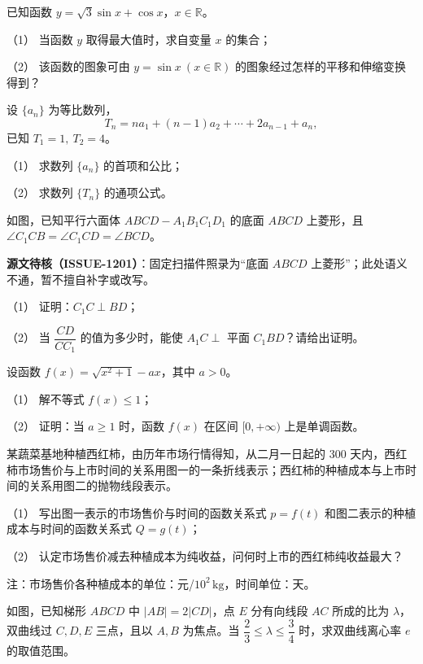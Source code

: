 \begin{question}
已知函数 $y=\sqrt{3}\sin x+\cos x$，$x\in\mathbb{R}$。

（1） 当函数 $y$ 取得最大值时，求自变量 $x$ 的集合；

（2） 该函数的图象可由 $y=\sin x\ (x\in\mathbb{R})$ 的图象经过怎样的平移和伸缩变换得到？

\end{question}
\begin{question}
设 $\{a_n\}$ 为等比数列，
\nopagebreak[4]
\[
T_n=na_1+(n-1)a_2+\cdots+2a_{n-1}+a_n,
\]
已知 $T_1=1,\ T_2=4$。

（1） 求数列 $\{a_n\}$ 的首项和公比；

（2） 求数列 $\{T_n\}$ 的通项公式。

\Needspace{0.4\textheight}
\end{question}
\begin{question}
如图，已知平行六面体 $ABCD-A_1B_1C_1D_1$ 的底面 $ABCD$ 上菱形，且 $\angle C_1CB=\angle C_1CD=\angle BCD$。

\begin{gktip}
\textbf{源文待核（ISSUE-1201）}：固定扫描件照录为“底面 $ABCD$ 上菱形”；此处语义不通，暂不擅自补字或改写。
\end{gktip}

（1） 证明：$C_1C\perp BD$；

（2） 当 $\dfrac{CD}{CC_1}$ 的值为多少时，能使 $A_1C\perp$ 平面 $C_1BD$？请给出证明。
\nopagebreak[4]
\begin{center}\end{center}
\nopagebreak[4]
\end{question}
\begin{question}
设函数 $f(x)=\sqrt{x^2+1}-ax$，其中 $a>0$。

（1） 解不等式 $f(x)\leq 1$；

（2） 证明：当 $a\geq1$ 时，函数 $f(x)$ 在区间 $[0,+\infty)$ 上是单调函数。

\Needspace{0.4\textheight}
\end{question}
\begin{question}
某蔬菜基地种植西红柿，由历年市场行情得知，从二月一日起的 300 天内，西红柿市场售价与上市时间的关系用图一的一条折线表示；西红柿的种植成本与上市时间的关系用图二的抛物线段表示。

（1） 写出图一表示的市场售价与时间的函数关系式 $p=f(t)$ 和图二表示的种植成本与时间的函数关系式 $Q=g(t)$；

（2） 认定市场售价减去种植成本为纯收益，问何时上市的西红柿纯收益最大？

注：市场售价各种植成本的单位：元/$10^2\,\mathrm{kg}$，时间单位：天。
\nopagebreak[4]
\begin{center}\end{center}
\nopagebreak[4]
\Needspace{0.4\textheight}
\end{question}
\begin{question}
如图，已知梯形 $ABCD$ 中 $|AB|=2|CD|$，点 $E$ 分有向线段 $AC$ 所成的比为 $\lambda$，双曲线过 $C,D,E$ 三点，且以 $A,B$ 为焦点。当 $\dfrac{2}{3}\leq\lambda\leq\dfrac{3}{4}$ 时，求双曲线离心率 $e$ 的取值范围。
\nopagebreak[4]
\begin{center}\end{center}
\nopagebreak[4]

\end{question}